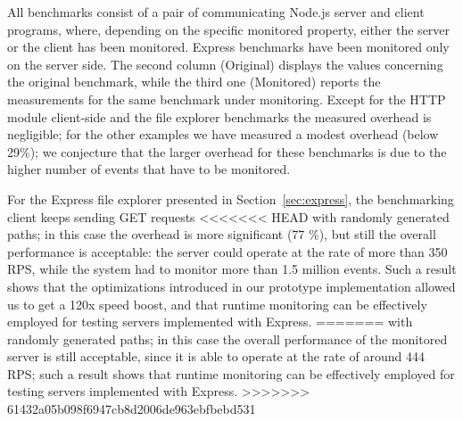 All benchmarks consist of a pair of communicating Node.js server and client programs, where, depending on the specific
monitored property, either the server or the client has been monitored. Express benchmarks have been monitored only on the server side.
The second column (Original) displays the values concerning the original benchmark, while the third one
(Monitored) reports the measurements for the same benchmark under monitoring.
Except for the HTTP module client-side and the file explorer benchmarks the measured overhead is negligible;
for the other examples we have measured a modest overhead (below 29\%); we conjecture that the larger overhead
for these benchmarks is due to the higher number of events that have to be monitored.

For the Express file explorer presented in Section~\ref{sec:express}, the benchmarking client keeps sending GET requests
<<<<<<< HEAD
with randomly generated paths; in this case the overhead is more significant (77 \%), but still the overall performance
is acceptable: the server could operate at the rate of more than 350 RPS, while the system had to monitor more than 1.5 million events.
Such a result shows that the optimizations introduced in our prototype implementation allowed us
to get a 120x speed boost, and that runtime monitoring can be effectively employed for testing servers implemented with Express.
=======
with randomly generated paths; in this case the overall performance of the monitored server
is still acceptable, since it is able to operate at the rate of around 444 RPS; such a result shows that runtime monitoring can be effectively
employed for testing servers implemented with Express.
>>>>>>> 61432a05b098f6947cb8d2006de963ebfbebd531

